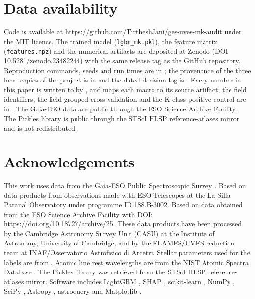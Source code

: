 \documentclass[11pt,a4paper]{article}
\begin{document}
\section*{Data availability}

Code is available at \url{https://github.com/TirtheshJani/ges-uves-mk-audit} under the MIT licence. The trained model (\texttt{lgbm\_mk.pkl}), the feature matrix (\texttt{features.npz}) and the numerical artifacts are deposited at Zenodo (DOI \href{https://doi.org/10.5281/zenodo.23482244}{10.5281/zenodo.23482244}) with the same release tag as the GitHub repository. Reproduction commands, seeds and run times are in ; the provenance of the three local copies of the project is in  and the dated decision log is . Every number in this paper is written to  by , and  maps each macro to its source artifact; the field identifiers, the field-grouped cross-validation and the K-class positive control are in . The Gaia-ESO data are public through the ESO Science Archive Facility. The Pickles library is public through the STScI HLSP reference-atlases mirror and is not redistributed.

\section*{Acknowledgements}

This work uses data from the Gaia-ESO Public Spectroscopic Survey \citep{2022A&A...666A.120G,2022A&A...666A.121R,2014A&A...565A.113S}. Based on data products from observations made with ESO Telescopes at the La Silla Paranal Observatory under programme ID 188.B-3002. Based on data obtained from the ESO Science Archive Facility with DOI: \url{https://doi.org/10.18727/archive/25}. These data products have been processed by the Cambridge Astronomy Survey Unit (CASU) at the Institute of Astronomy, University of Cambridge, and by the FLAMES/UVES reduction team at INAF/Osservatorio Astrofisico di Arcetri. Stellar parameters used for the labels are from \citet{2023A&A...676A.129H}. Atomic line rest wavelengths are from the NIST Atomic Spectra Database \citep{NIST_ASD_2023}. The Pickles library was retrieved from the STScI HLSP reference-atlases mirror. Software includes LightGBM \citep{Ke2017LightGBM}, SHAP \citep{LundbergLee2017SHAP,Lundberg2020TreeSHAP}, scikit-learn \citep{Pedregosa2011sklearn}, NumPy \citep{Harris2020numpy}, SciPy \citep{Virtanen2020scipy}, Astropy \citep{Astropy2022}, astroquery \citep{Ginsburg2019astroquery} and Matplotlib \citep{Hunter2007matplotlib}.
\end{document}
